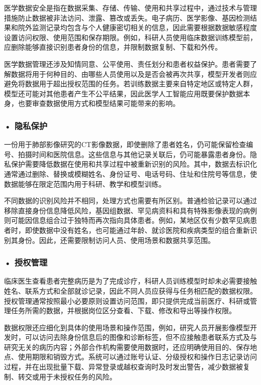 医学数据安全是指在数据采集、存储、传输、使用和共享过程中，通过技术与管理措施防止数据被非法访问、泄露、篡改或丢失。电子病历、医学影像、基因检测结果和院外监测记录均包含与个人健康密切相关的信息，因此需要根据数据敏感程度设置访问权限、使用范围和保存期限。例如，科研人员使用临床数据训练模型前，应删除能够直接识别患者身份的信息，并限制数据复制、下载和外传。

医学数据管理还涉及知情同意、公平使用、责任划分和患者权益保护。患者需要了解数据将用于何种目的、由哪些人员使用以及是否会被再次共享，模型开发者则应避免将数据用于超出授权范围的任务。若训练数据主要来自特定地区或特定人群，模型还可能对其他患者产生不公平结果，因此医学人工智能应用既要保护数据本身，也要审查数据使用方式和模型结果可能带来的影响。

\subsubsection*{\textbf{• 隐私保护}}

一份用于肺部影像研究的CT影像数据，即使删除了患者姓名，仍可能保留检查编号、拍摄时间和医院信息。这些信息与其他记录关联后，仍可能暴露患者身份。隐私保护需要降低数据在使用和共享过程中被重新识别的风险。其中，数据去标识化通常通过删除、替换或模糊姓名、身份证号、电话号码、住址和住院号等信息，使数据能够在限定范围内用于科研、教学和模型训练。

不同数据的识别风险并不相同，处理方式也需要有所区别。普通检验记录可以通过移除直接身份信息降低风险，基因组数据、罕见病资料和具有特殊影像表现的病例则可能因信息组合过于独特而再次指向具体患者。例如，某地区仅有少数罕见病患者时，即使数据中没有姓名，也可能通过年龄、就诊医院和疾病类型的组合重新识别其身份。因此，还需要限制访问人员、使用场景和数据共享范围。

\subsubsection*{\textbf{• 授权管理}}

临床医生查看患者完整病历是为了完成诊疗，科研人员训练模型时却未必需要接触姓名、联系方式和全部就诊记录，因此不同人员应获得与任务相匹配的数据权限。授权管理通常按照最小必要原则设置访问范围，即只提供完成当前医疗、科研或管理任务所需的数据，并根据岗位区分查看、下载、修改和导出等操作权限。

数据权限还应细化到具体的使用场景和操作范围，例如，研究人员开展影像模型开发时，可以访问去除身份信息后的图像和诊断标签，但不应接触患者联系方式及与研究无关的病历内容；外部合作机构需要使用数据时，还应明确使用目的、保存地点、使用期限和销毁方式。系统可以通过账号认证、分级授权和操作日志记录访问过程，并在出现批量下载、异常登录或越权查询时及时发出警告，减少数据被复制、转交或用于未授权任务的风险。


